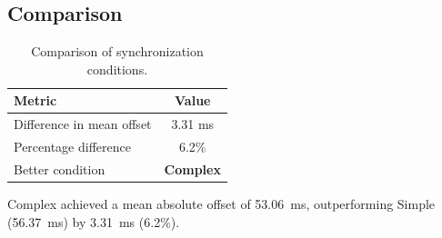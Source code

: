\subsection*{Comparison}

\begin{table}[h!]
\centering
\begin{tabular}{|l|c|}
\hline
Metric & Value \\
\hline
Difference in mean offset & 3.31 ms \\
Percentage difference & 6.2\% \\
Better condition & \textbf{Complex} \\
\hline
\end{tabular}
\caption{Comparison of synchronization conditions.}
\label{tab:sync_comparison}
\end{table}

Complex achieved a mean absolute offset of 53.06~ms, outperforming Simple (56.37~ms) by 3.31~ms (6.2\%).
